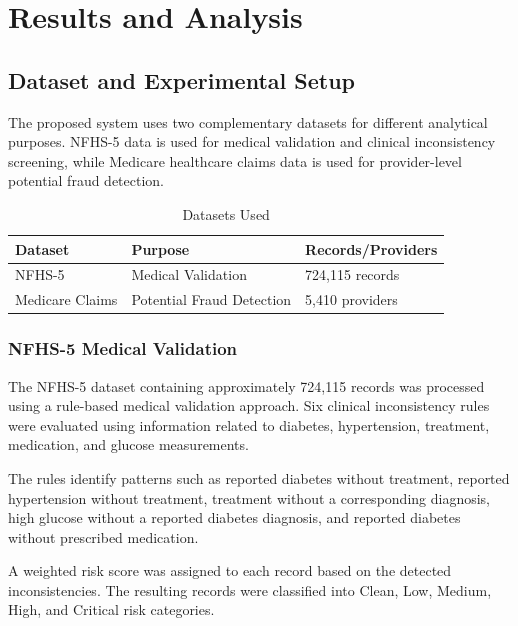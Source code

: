 \chapter{Results and Analysis}

\section{Dataset and Experimental Setup}

The proposed system uses two complementary datasets for different analytical purposes. NFHS-5 data is used for medical validation and clinical inconsistency screening, while Medicare healthcare claims data is used for provider-level potential fraud detection.

\begin{table}[h!]
\centering
\begin{tabular}{|l|l|l|}
\hline
\textbf{Dataset} & \textbf{Purpose} & \textbf{Records/Providers} \\
\hline
NFHS-5 & Medical Validation & 724,115 records \\
\hline
Medicare Claims & Potential Fraud Detection & 5,410 providers \\
\hline
\end{tabular}
\caption{Datasets Used}
\label{tab:datasets}
\end{table}

\subsection{NFHS-5 Medical Validation}

The NFHS-5 dataset containing approximately 724,115 records was processed using a rule-based medical validation approach. Six clinical inconsistency rules were evaluated using information related to diabetes, hypertension, treatment, medication, and glucose measurements.

The rules identify patterns such as reported diabetes without treatment, reported hypertension without treatment, treatment without a corresponding diagnosis, high glucose without a reported diabetes diagnosis, and reported diabetes without prescribed medication.

A weighted risk score was assigned to each record based on the detected inconsistencies. The resulting records were classified into Clean, Low, Medium, High, and Critical risk categories.

